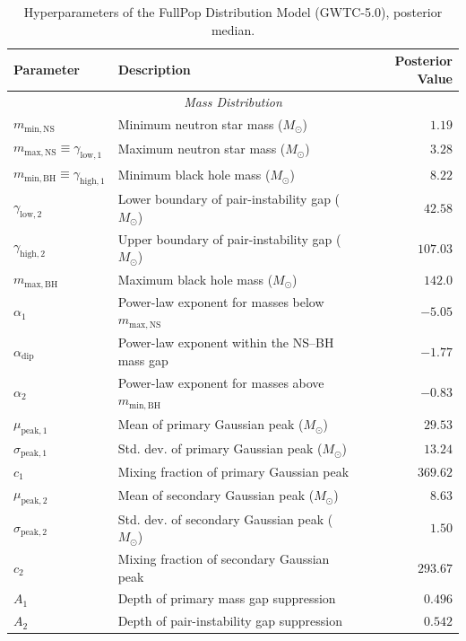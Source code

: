 \begin{table}[htb]
\renewcommand\arraystretch{1.08}
\setlength{\tabcolsep}{16pt}
\centering
\caption{Hyperparameters of the FullPop Distribution Model (GWTC-5.0), posterior median.}
\label{tab:hyperparams}
\begin{tabular}{llr}
\toprule
\textbf{Parameter} & \textbf{Description} & \textbf{Posterior Value} \\
\midrule
\multicolumn{3}{c}{\textit{Mass Distribution}} \\
\midrule
$m_{\mathrm{min,NS}}$ & Minimum neutron star mass ($M_\odot$) & $1.19$ \\
$m_{\mathrm{max,NS}} \equiv \gamma_{\mathrm{low},1}$ & Maximum neutron star mass ($M_\odot$) & $3.28$ \\
$m_{\mathrm{min,BH}} \equiv \gamma_{\mathrm{high},1}$ & Minimum black hole mass ($M_\odot$) & $8.22$ \\
$\gamma_{\mathrm{low},2}$  & Lower boundary of pair-instability gap ($M_\odot$) & $42.58$ \\
$\gamma_{\mathrm{high},2}$ & Upper boundary of pair-instability gap ($M_\odot$) & $107.03$ \\
$m_{\mathrm{max,BH}}$ & Maximum black hole mass ($M_\odot$) & $142.0$ \\
\midrule
$\alpha_1$ & Power-law exponent for masses below $m_{\mathrm{max,NS}}$ & $-5.05$ \\
$\alpha_{\mathrm{dip}}$ & Power-law exponent within the NS–BH mass gap & $-1.77$ \\
$\alpha_2$ & Power-law exponent for masses above $m_{\mathrm{min,BH}}$ & $-0.83$ \\
\midrule
$\mu_{\mathrm{peak},1}$ & Mean of primary Gaussian peak ($M_\odot$) & $29.53$ \\
$\sigma_{\mathrm{peak},1}$ & Std. dev. of primary Gaussian peak ($M_\odot$) & $13.24$ \\
$c_1$ & Mixing fraction of primary Gaussian peak & $369.62$ \\
$\mu_{\mathrm{peak},2}$ & Mean of secondary Gaussian peak ($M_\odot$) & $8.63$ \\
$\sigma_{\mathrm{peak},2}$ & Std. dev. of secondary Gaussian peak ($M_\odot$) & $1.50$ \\
$c_2$ & Mixing fraction of secondary Gaussian peak & $293.67$ \\
\midrule
$A_1$ & Depth of primary mass gap suppression & $0.496$ \\
$A_2$ & Depth of pair-instability gap suppression & $0.542$ \\


\end{tabular}
\end{table}
